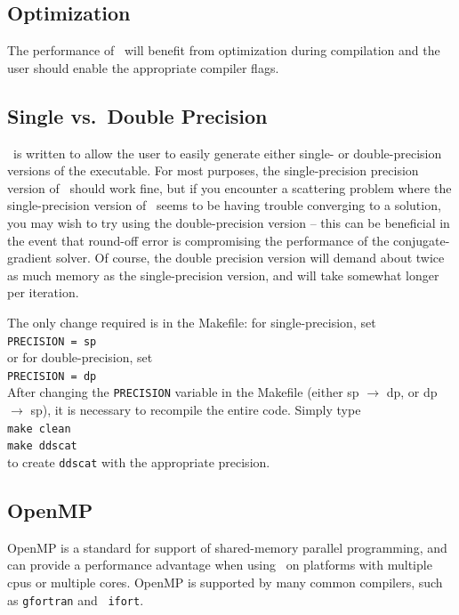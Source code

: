 \subsection{ Optimization}
The performance of \ddscatv\ will benefit from optimization during compilation
and the user should enable the
appropriate compiler flags.

\subsection{ Single vs.\ Double Precision}
\ddscatv\ is written to allow the user to easily generate either single- or
double-precision versions of the executable.  
For most purposes, the single-precision precision version of \ddscatv\
should work fine, but if you encounter a scattering 
problem where the single-precision version
of \ddscatv\ seems to be having trouble converging to a solution, you
may wish to try using the double-precision version -- this
can be beneficial in the event that round-off error is compromising
the performance of the conjugate-gradient solver.
Of course, the double precision version will demand about twice as much
memory as the single-precision version, 
and will take somewhat longer per iteration.

The only change required
is in the Makefile: for single-precision, set\\
 {\tt PRECISION = sp}\\
or for double-precision, set\\
 {\tt PRECISION = dp}\\
After changing the {\tt PRECISION} variable in the Makefile
(either sp $\rightarrow$ dp,
or dp $\rightarrow$ sp), it is necessary to recompile the
entire code.  Simply type\\
 {\tt make clean}\\
 {\tt make ddscat}\\
to create {\tt ddscat} with the appropriate precision.


\subsection{ OpenMP}

OpenMP is a standard for support of shared-memory parallel programming,
and can provide a performance advantage when using \ddscatv\ on
platforms with multiple cpus or multiple cores.
OpenMP is supported by many common compilers, such as {\tt gfortran}
and \Intel\ {\tt ifort}.

